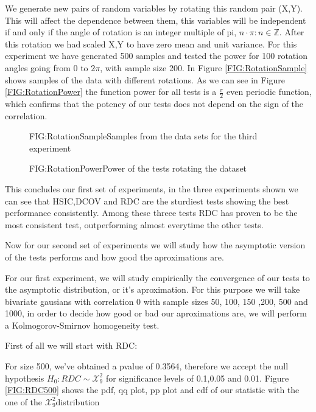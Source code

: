 We generate new pairs of random variables by rotating this random pair (X,Y). This will affect the dependence between them, this variables will be independent if and only if the angle of rotation is an integer multiple of pi, $n\cdot\pi : n\in\mathbb{Z}$. After this rotation we had scaled X,Y to have zero mean and unit variance.
For this experiment we have generated 500 samples and tested the power for 100 rotation angles going from 0 to $2\pi$, with sample size 200. In Figure \ref{FIG:RotationSample} shows samples of the data with different rotations.
As we can see in Figure \ref{FIG:RotationPower} the function power for all tests is a $\frac{\pi}{2}$ even periodic function, which confirms that the potency of our tests does not depend on the sign of the correlation.

\begin{figure}[Experiment 3 rotation pattern sample]{FIG:RotationSample}{Samples from the data sets for the third experiment}
\end{figure}
\begin{figure}[Experiment 3 results]{FIG:RotationPower}{Power of the tests rotating the dataset}
\end{figure}

This concludes our first set of experiments, in the three experiments shown we can see that HSIC,DCOV and RDC are the sturdiest tests showing the best performance consistently. Among these threee tests RDC has proven to be the most consistent test, outperforming almost everytime the other tests. 

Now for our second set of experiments we will study how the asymptotic version of the tests performs and how good the aproximations are.

For our first experiment, we will study empirically the convergence of our tests to the asymptotic distribution, or it's aproximation. For this purpose we will take  bivariate gausians with correlation 0 with sample sizes  50, 100, 150 ,200, 500 and 1000, in order to decide how good or bad our aproximations are, we will perform a Kolmogorov-Smirnov homogeneity test.

First of all we will start with RDC:

For size 500, we've obtained a pvalue of 0.3564, therefore we accept the null hypothesis $H_{0}: RDC\sim \mathcal{X}^{2}_{9}$ for significance levels of 0.1,0.05 and 0.01. Figure \ref{FIG:RDC500} shows the pdf, qq plot, pp plot and cdf of our statistic with the one of the $\mathcal{X}^{2}_{9}$distribution

